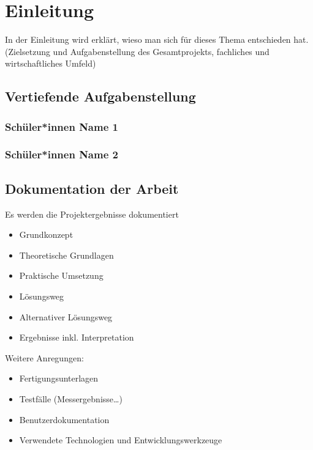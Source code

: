 
\chapter{Einleitung}

In der Einleitung wird erklärt, wieso man sich für dieses Thema entschieden hat. (Zielsetzung und Aufgabenstellung des Gesamtprojekts, fachliches und wirtschaftliches Umfeld)

\section{Vertiefende Aufgabenstellung}

\subsection{Schüler*innen Name 1}

\subsection{Schüler*innen Name 2}

\section{Dokumentation der Arbeit}

Es werden die Projektergebnisse dokumentiert

\begin{itemize}
	\item Grundkonzept
	\item Theoretische Grundlagen
	\item Praktische Umsetzung
	\item Lösungsweg
	\item Alternativer Lösungsweg
	\item Ergebnisse inkl. Interpretation
\end{itemize}

Weitere Anregungen:

\begin{itemize}
	\item Fertigungsunterlagen
	\item Testfälle (Messergebnisse…)
	\item Benutzerdokumentation
	\item Verwendete Technologien und Entwicklungswerkzeuge
\end{itemize}